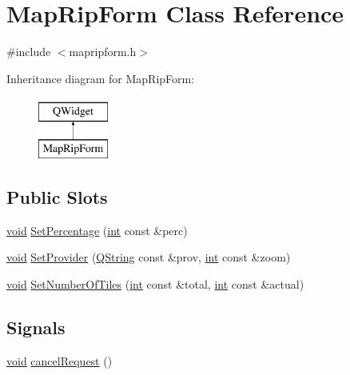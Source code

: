 \hypertarget{class_map_rip_form}{\section{Map\-Rip\-Form Class Reference}
\label{class_map_rip_form}
}


{\ttfamily \#include $<$mapripform.\-h$>$}

Inheritance diagram for Map\-Rip\-Form\-:\begin{figure}[H]
\begin{center}
\leavevmode
\includegraphics[height=2.000000cm]{class_map_rip_form}
\end{center}
\end{figure}
\subsection*{Public Slots}
\begin{DoxyCompactItemize}
\item 
\hyperlink{group___u_a_v_objects_plugin_ga444cf2ff3f0ecbe028adce838d373f5c}{void} \hyperlink{group___o_p_map_widget_gae4b3b2cf5a261ca12edc1e1f092f7790}{Set\-Percentage} (\hyperlink{ioapi_8h_a787fa3cf048117ba7123753c1e74fcd6}{int} const \&perc)
\item 
\hyperlink{group___u_a_v_objects_plugin_ga444cf2ff3f0ecbe028adce838d373f5c}{void} \hyperlink{group___o_p_map_widget_gabf71ea1f21a81271ca9487530d7c9b23}{Set\-Provider} (\hyperlink{group___u_a_v_objects_plugin_gab9d252f49c333c94a72f97ce3105a32d}{Q\-String} const \&prov, \hyperlink{ioapi_8h_a787fa3cf048117ba7123753c1e74fcd6}{int} const \&zoom)
\item 
\hyperlink{group___u_a_v_objects_plugin_ga444cf2ff3f0ecbe028adce838d373f5c}{void} \hyperlink{group___o_p_map_widget_ga7f74961ce862f3c6173a9634b3de2e53}{Set\-Number\-Of\-Tiles} (\hyperlink{ioapi_8h_a787fa3cf048117ba7123753c1e74fcd6}{int} const \&total, \hyperlink{ioapi_8h_a787fa3cf048117ba7123753c1e74fcd6}{int} const \&actual)
\end{DoxyCompactItemize}
\subsection*{Signals}
\begin{DoxyCompactItemize}
\item 
\hyperlink{group___u_a_v_objects_plugin_ga444cf2ff3f0ecbe028adce838d373f5c}{void} \hyperlink{group___o_p_map_widget_gada316d63680a0cc029958b0d0eb33f4a}{cancel\-Request} ()
\end{DoxyCompactItemize}
